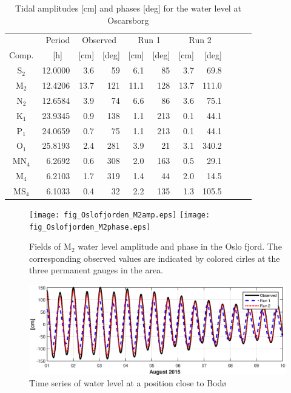 \begin{table}[ht]
\caption{Tidal amplitudes [cm] and phases [deg] for the water level at Oscarsborg}
\label{tab:Oscarsborg}
\centering
\begin{tabular}{crrrrrrrrrr} \hline
      & Period & \multicolumn{2}{c}{Observed} & \multicolumn{2}{c}{Run 1} & \multicolumn{2}{c}{Run 2}  \\
Comp. & [h] $\;\;$ & [cm] & [deg] & [cm] & [deg] & [cm] & [deg]  \\ \hline 
S$_2$  & 12.0000 &  3.6 &  59  &   6.1 &  85  &  3.7 &  69.8  \\
M$_2$  & 12.4206 & 13.7 & 121  &  11.1 & 128  & 13.7 & 111.0  \\
N$_2$  & 12.6584 &  3.9 &  74  &   6.6 &  86  &  3.6 &  75.1  \\
K$_1$  & 23.9345 &  0.9 & 138  &   1.1 & 213  &  0.1 &  44.1  \\
P$_1$  & 24.0659 &  0.7 &  75  &   1.1 & 213  &  0.1 &  44.1  \\
O$_1$  & 25.8193 &  2.4 & 281  &   3.9 &  21  &  3.1 & 340.2  \\
MN$_4$ &  6.2692 &  0.6 & 308  &   2.0 & 163  &  0.5 &  29.1  \\
M$_4$  &  6.2103 &  1.7 & 319  &   1.4 &  44  &  2.0 &  14.5  \\
MS$_4$ &  6.1033 &  0.4 &  32  &   2.2 & 135  &  1.3 & 105.5  \\ \hline 
\end{tabular}
\end{table}




\begin{figure}[!t]
\centering
\texttt{[image: fig\_Oslofjorden\_M2amp.eps]}
\texttt{[image: fig\_Oslofjorden\_M2phase.eps]}
\caption{Fields of M$_2$ water level amplitude and phase in the Oslo fjord. The corresponding observed values are indicated by colored cirles at the three permanent gauges in the area.}
\label{fig:Oslofjord_tidal_fields}
\end{figure}


\begin{figure}[!t]
\centering
\includegraphics[width=\textwidth]{fig_Saltstraumen_timeseries}
\caption{Time series of water level at a position close to Bod\o}
\label{fig:Saltstraumen_timeseries}
\end{figure}


